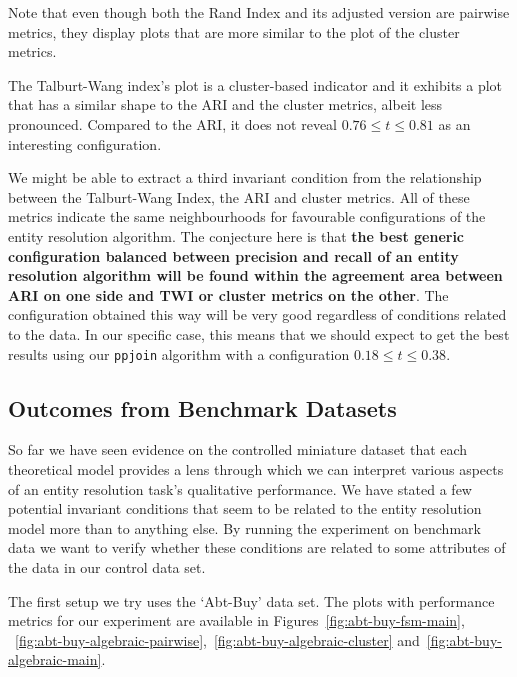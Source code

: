 Note that even though both the Rand Index and its adjusted version are pairwise
metrics, they display plots that are more similar to the plot of the cluster
metrics.

The Talburt-Wang index's plot is a cluster-based indicator and it exhibits a
plot that has a similar shape to the ARI and the cluster metrics, albeit less
pronounced.
Compared to the ARI, it does not reveal $0.76 \le t \le 0.81$ as an interesting
configuration.

We might be able to extract a third invariant condition from the relationship
between the Talburt-Wang Index, the ARI and cluster metrics.
All of these metrics indicate the same neighbourhoods for favourable
configurations of the entity resolution algorithm.
The conjecture here is that \textbf{the best generic configuration balanced
between precision and recall of an entity resolution algorithm will be found
within the agreement area between ARI on one side and TWI or cluster metrics on
the other}.
The configuration obtained this way will be very good regardless of conditions
related to the data.
In our specific case, this means that we should expect to get the best results
using our \texttt{ppjoin} algorithm with a configuration $0.18 \le t \le 0.38$.

\subsection{Outcomes from Benchmark Datasets}\label{subsec:Benchmark Datasets}

So far we have seen evidence on the controlled miniature dataset that each
theoretical model provides a lens through which we can interpret various aspects
of an entity resolution task's qualitative performance.
We have stated a few potential invariant conditions that seem to be related to
the entity resolution model more than to anything else.
By running the experiment on benchmark data we want to verify whether these
conditions are related to some attributes of the data in our control data set.

The first setup we try uses the `Abt-Buy' data set.
The plots with performance metrics for our experiment are available in Figures~\ref{fig:abt-buy-fsm-main},
~\ref{fig:abt-buy-algebraic-pairwise},~\ref{fig:abt-buy-algebraic-cluster}
and~\ref{fig:abt-buy-algebraic-main}.


